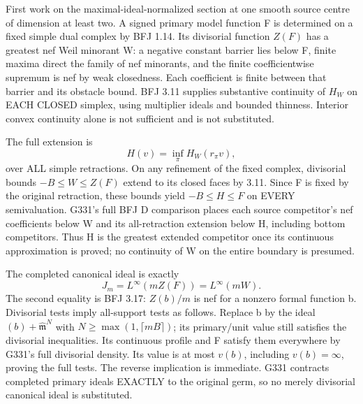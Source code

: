 \documentclass[11pt]{article}
\begin{document}
First work on the maximal-ideal-normalized section at one smooth source
centre of dimension at least two. A signed primary model function F is
determined on a fixed simple dual complex by BFJ 1.14. Its divisorial
function $Z(F)$ has a greatest nef Weil minorant W: a negative constant
barrier lies below F, finite maxima direct the family of nef minorants,
and the finite coefficientwise supremum is nef by weak closedness.
Each coefficient is finite between that barrier and its obstacle bound.
BFJ 3.11 supplies substantive continuity of $H_W$ on EACH CLOSED simplex,
using multiplier ideals and bounded thinness. Interior convex continuity
alone is not sufficient and is not substituted.

The full extension is
\[
                   H(v)=\inf_\pi H_W(r_\pi v),
\]
over ALL simple retractions. On any refinement of the fixed complex,
divisorial bounds $-B\le W\le Z(F)$ extend to its closed faces by 3.11.
Since F is fixed by the original retraction, these bounds yield
$-B\le H\le F$ on EVERY semivaluation. G331's full BFJ D comparison
places each source competitor's nef coefficients below W and its
all-retraction extension below H, including bottom competitors. Thus H
is the greatest extended competitor once its continuous approximation
is proved; no continuity of W on the entire boundary is presumed.

The completed canonical ideal is exactly
\[
          J_m=L^\infty(mZ(F))=L^\infty(mW).
\]
The second equality is BFJ 3.17: $Z(b)/m$ is nef for a nonzero formal
function b. Divisorial tests imply all-support tests as follows. Replace
b by the ideal $(b)+\widehat{\mathfrak m}^{N}$ with
$N\ge\max(1,\lceil mB\rceil)$; its primary/unit value still satisfies
the divisorial inequalities. Its continuous profile and F satisfy them
everywhere by G331's full divisorial density. Its value is at most $v(b)$,
including $v(b)=\infty$, proving the full tests. The reverse implication
is immediate. G331 contracts completed primary ideals EXACTLY to the
original germ, so no merely divisorial canonical ideal is substituted.
\end{document}
